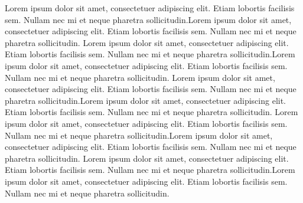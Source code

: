 \documentclass[12pt]{article}
\begin{document}
Lorem ipsum dolor sit amet, consectetuer adipiscing elit. 
Etiam lobortis facilisis sem. Nullam nec mi et neque pharetra sollicitudin.Lorem ipsum dolor sit amet, consectetuer adipiscing elit. Etiam lobortis facilisis sem. Nullam nec mi et neque pharetra sollicitudin. Lorem ipsum dolor sit amet, consectetuer adipiscing elit. 
Etiam lobortis facilisis sem. Nullam nec mi et neque pharetra sollicitudin.Lorem ipsum dolor sit amet, consectetuer adipiscing elit. Etiam lobortis facilisis sem. Nullam nec mi et neque pharetra sollicitudin. Lorem ipsum dolor sit amet, consectetuer adipiscing elit. 
Etiam lobortis facilisis sem. Nullam nec mi et neque pharetra sollicitudin.Lorem ipsum dolor sit amet, consectetuer adipiscing elit. Etiam lobortis facilisis sem. Nullam nec mi et neque pharetra sollicitudin. Lorem ipsum dolor sit amet, consectetuer adipiscing elit. 
Etiam lobortis facilisis sem. Nullam nec mi et neque pharetra sollicitudin.Lorem ipsum dolor sit amet, consectetuer adipiscing elit. Etiam lobortis facilisis sem. Nullam nec mi et neque pharetra sollicitudin. Lorem ipsum dolor sit amet, consectetuer adipiscing elit. 
Etiam lobortis facilisis sem. Nullam nec mi et neque pharetra sollicitudin.Lorem ipsum dolor sit amet, consectetuer adipiscing elit. Etiam lobortis facilisis sem. Nullam nec mi et neque pharetra sollicitudin.
\end{document}
